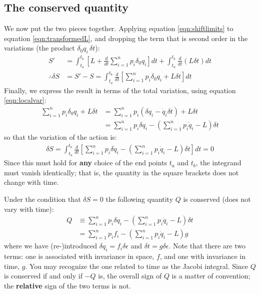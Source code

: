 \subsection{The conserved quantity}
We now put the two pieces together. Applying equation \ref{eqn:shiftlimits} to equation \ref{eqn:transformedL}, and dropping the term that is second order in the variations (the product $\delta_0 q_i\,\delta t$):
\begin{align}
S'&=\int_{t_a}^{t_b}\left[L+\frac{d}{dt}\sum_{i=1}^n p_i\delta_0 q_i\right]dt+\int_{t_a}^{t_b}\frac{d}{dt}\left(L\delta t\right)dt\nonumber\\
\therefore \delta S&=S'-S=\int_{t_a}^{t_b}\frac{d}{dt}\left[\sum_{i=1}^n p_i\delta_0 q_i+L\delta t\right]dt
\end{align}
Finally, we express the result in terms of the total variation, using equation \ref{eqn:localvar}:
\begin{align}
\sum_{i=1}^n p_i\delta_0 q_i+L\delta t&=\sum_{i=1}^n p_i\left(\delta q_i-\dot{q}_i\delta t\right)+L\delta t\nonumber\\
&=\sum_{i=1}^n p_i\delta q_i-\left(\sum_{i=1}^n p_i\dot{q}_i-L\right)\delta t
\end{align}
so that the variation of the action is:
\begin{align}
\delta S=\int_{t_a}^{t_b}\frac{d}{dt}\left[\sum_{i=1}^n p_i\delta q_i-\left(\sum_{i=1}^n p_i\dot{q}_i-L\right)\delta t\right]dt=0
\end{align}
Since this must hold for \textbf{any} choice of the end points $t_a$ and $t_b$, the integrand must vanish identically; that is, the quantity in the square brackets does not change with time.

Under the condition that $\delta S=0$ the following quantity $Q$ is conserved (does not vary with time):
\begin{align}
Q&\equiv\sum_{i=1}^np_i\delta q_i -\left(\sum_{i=1}^n p_i\dot{q}_i-L\right)\delta t\nonumber\\
&=\sum_{i=1}^n p_if_i -\left(\sum_{i=1}^n p_i\dot{q}_i-L\right)g\nonumber
\end{align}
where we have (re-)introduced $\delta q_i=f_i\delta\epsilon$ and $\delta t=g\delta\epsilon$. Note that there are two terms: one is associated with invariance in space, $f$, and one with invariance in time, $g$. You may recognize the one related to time as the Jacobi integral. Since $Q$ is conserved if and only if $-Q$ is, the overall sign of $Q$ is a matter of convention; the \textbf{relative} sign of the two terms is not.

